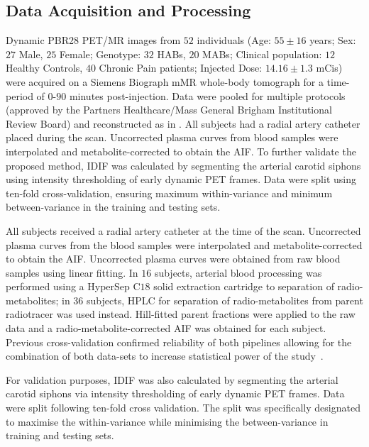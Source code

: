         \subsection{Data Acquisition and Processing} \label{sec:a_bayesian_neural_network-based_method_for_the_extraction_of_a_metabolite_corrected_arterial_input_function_from_dynamic_pbr28_pet_appendix_methods_data_acquisition_and_processing}
            Dynamic \gls{PBR28} \gls{PET}/\gls{MR} images from $52$ individuals (Age: $55 \pm 16$ years; Sex: $27$ Male, $25$ Female; Genotype: $32$ \glspl{HAB}, $20$ \glspl{MAB}; Clinical population: $12$ Healthy Controls, $40$ Chronic Pain patients; Injected Dose: $14.16 \pm 1.3$ \glspl{mCi}) were acquired on a Siemens Biograph mMR whole-body tomograph for a time-period of $0$-$90$ minutes post-injection. Data were pooled for multiple protocols (approved by the Partners Healthcare/Mass General Brigham Institutional Review Board) and reconstructed as in \cite{Brusaferri2022ThePandemic}. All subjects had a radial artery catheter placed during the scan. Uncorrected plasma curves from blood samples were interpolated and metabolite-corrected to obtain the \gls{AIF}. To further validate the proposed method, \gls{IDIF} was calculated by segmenting the arterial carotid siphons using intensity thresholding of early dynamic \gls{PET} frames. Data were split using ten-fold cross-validation, ensuring maximum within-variance and minimum between-variance in the training and testing sets.
        
            All subjects received a radial artery catheter at the time of the scan. Uncorrected plasma curves from the blood samples were interpolated and metabolite-corrected to obtain the \gls{AIF}. Uncorrected plasma curves were obtained from raw blood samples using linear fitting. In $16$ subjects, arterial blood processing was performed using a HyperSep C$18$ solid extraction cartridge to separation of radio-metabolites; in $36$ subjects, \gls{HPLC} for separation of radio-metabolites from parent radiotracer was used instead. Hill-fitted parent fractions were applied to the raw data and a radio-metabolite-corrected \gls{AIF} was obtained for each subject. Previous cross-validation confirmed reliability of both pipelines allowing for the combination of both data-sets to increase statistical power of the study~\cite{Brusaferri2022ThePandemic}. 
            
            For validation purposes, \gls{IDIF} was also calculated by segmenting the arterial carotid siphons via intensity thresholding of early  dynamic \gls{PET} frames. Data were split following ten-fold cross validation. The split was specifically designated to maximise the within-variance while minimising the between-variance in training and testing sets.
        
